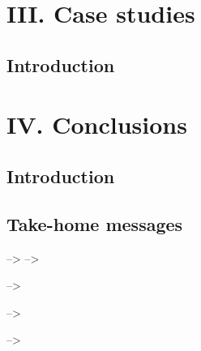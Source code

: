 \documentclass[
  12pt,
]{krantz}
\begin{document}
\hypertarget{part-iii.-case-studies}{%
\part{III. Case studies}\label{part-iii.-case-studies}}

\hypertarget{introduction-3}{%
\chapter*{Introduction}\label{introduction-3}}


\hypertarget{part-iv.-conclusions}{%
\part{IV. Conclusions}\label{part-iv.-conclusions}}

\hypertarget{introduction-4}{%
\chapter*{Introduction}\label{introduction-4}}


\hypertarget{take-home-messages}{%
\chapter*{Take-home messages}\label{take-home-messages}}


--\textgreater{}
--\textgreater{}

--\textgreater{}

--\textgreater{}

--\textgreater{}

\backmatter

  

\printindex
\end{document}
